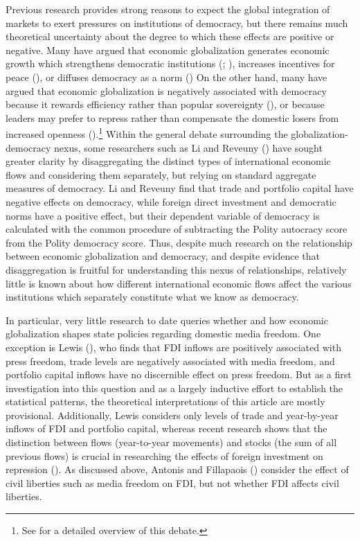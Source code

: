 \documentclass[12pt]{report}
\begin{document}
Previous research provides strong reasons to expect the global integration
of markets to exert pressures on institutions of democracy, but there
remains much theoretical uncertainty about the degree to which these
effects are positive or negative. Many have argued that economic globalization
generates economic growth which strengthens democratic institutions
(\citealt{Baghwati:1997vy}; \citealt{Im:1996cl}), increases incentives
for peace (\citealt{Baghwati:1997vy,Oneal:1999fc}), or diffuses democracy
as a norm (\citealt{Kant:1983uf,Limongi:1996dr}) On the other hand,
many have argued that economic globalization is negatively associated
with democracy because it rewards efficiency rather than popular sovereignty
(\citealt{Huntington:1975vt,Lindblom:1977ue,Cammack:1998gf}), or
because leaders may prefer to repress rather than compensate the domestic
losers from increased openness (\citealt{Adsera:2002vt}).\footnote{See \citealt{Li:2003vj} for a detailed overview of this debate.%
} Within the general debate surrounding the globalization-democracy
nexus, some researchers such as Li and Reveuny (\citeyear{Li:2003vj})
have sought greater clarity by disaggregating the distinct types of
international economic flows and considering them separately, but
relying on standard aggregate measures of democracy. Li and Reveuny
find that trade and portfolio capital have negative effects on democracy,
while foreign direct investment and democratic norms have a positive
effect, but their dependent variable of democracy is calculated with
the common procedure of subtracting the Polity autocracy score from
the Polity democracy score. Thus, despite much research on the relationship
between economic globalization and democracy, and despite evidence
that disaggregation is fruitful for understanding this nexus of relationships,
relatively little is known about how different international economic
flows affect the various institutions which separately constitute
what we know as democracy.

In particular, very little research to date queries whether and how
economic globalization shapes state policies regarding domestic media
freedom. One exception is Lewis (\citeyear{Anonymous:lbhrCJXF}),
who finds that FDI inflows are positively associated with press freedom,
trade levels are negatively associated with media freedom, and portfolio
capital inflows have no discernible effect on press freedom. But as
a first investigation into this question and as a largely inductive
effort to establish the statistical patterns, the theoretical interpretations
of this article are mostly provisional. Additionally, Lewis considers
only levels of trade and year-by-year inflows of FDI and portfolio
capital, whereas recent research shows that the distinction between
flows (year-to-year movements) and stocks (the sum of all previous
flows) is crucial in researching the effects of foreign investment
on repression (\citeyear{Sorens:2012hc}). As discussed above, Antonis
and Fillapaois (\citeyear{Adam:2007gn}) consider the effect of civil
liberties such as media freedom on FDI, but not whether FDI affects
civil liberties.
\end{document}
